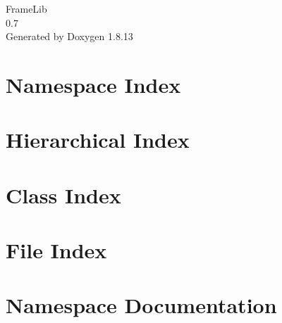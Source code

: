 \documentclass[twoside]{book}
\newcommand{\+}{\discretionary{\mbox{\scriptsize$\hookleftarrow$}}{}{}}
\newcommand{\clearemptydoublepage}{%
  \newpage{\pagestyle{empty}\cleardoublepage}%
}
\begin{document}
\hypersetup{pageanchor=false,
             bookmarksnumbered=true,
             pdfencoding=unicode
            }
\begin{titlepage}
\vspace*{7cm}
\begin{center}%
{\Large Frame\+Lib \\[1ex]\large 0.\+7 }\\
\vspace*{1cm}
{\large Generated by Doxygen 1.8.13}\\
\end{center}
\end{titlepage}
\clearemptydoublepage
{}
\tableofcontents
\clearemptydoublepage
{}
\hypersetup{pageanchor=true}

\chapter{Namespace Index}

\chapter{Hierarchical Index}

\chapter{Class Index}

\chapter{File Index}

\chapter{Namespace Documentation}

\end{document}
